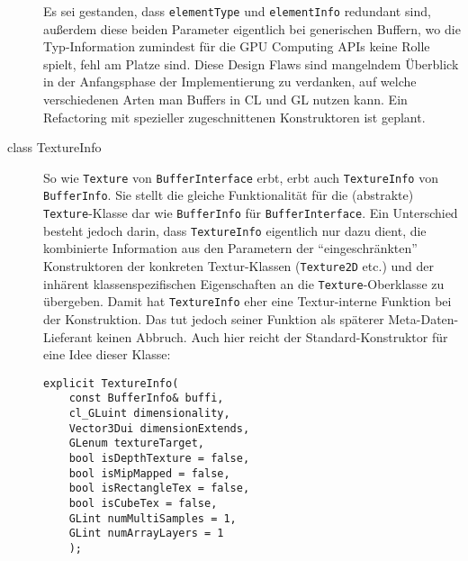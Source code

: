 \begin{description}
		Es sei gestanden, dass \lstinline|elementType| und \lstinline|elementInfo| redundant sind, außerdem diese 
		beiden Parameter eigentlich bei generischen Buffern, wo die Typ-Information zumindest für die GPU Computing APIs
		keine Rolle spielt, fehl am Platze sind. Diese Design Flaws sind mangelndem Überblick in der Anfangsphase der 
		Implementierung zu verdanken, auf welche verschiedenen Arten man Buffers in CL und GL nutzen kann. 
		Ein Refactoring mit spezieller zugeschnittenen Konstruktoren ist geplant.
	
	\item[class TextureInfo]
		So wie \lstinline|Texture| von \lstinline|BufferInterface| erbt, erbt auch 
		\lstinline|TextureInfo| von \lstinline|BufferInfo|. Sie stellt die gleiche Funktionalität für
		die (abstrakte) \lstinline|Texture|-Klasse dar wie \lstinline|BufferInfo| für \lstinline|BufferInterface|.
		Ein Unterschied besteht jedoch darin, dass \lstinline|TextureInfo| eigentlich nur dazu dient, 
		die kombinierte Information aus den Parametern der "`eingeschränkten"' Konstruktoren 
		der konkreten Textur-Klassen (\lstinline|Texture2D| etc.) und der inhärent klassenspezifischen
		Eigenschaften an die \lstinline|Texture|-Oberklasse zu übergeben. Damit hat \lstinline|TextureInfo|
		eher eine Textur-interne Funktion bei der Konstruktion. Das tut jedoch seiner Funktion als späterer
		Meta-Daten-Lieferant keinen Abbruch.
		Auch hier reicht der Standard-Konstruktor für eine Idee dieser Klasse:
		 
		\begin{lstlisting}	
explicit TextureInfo(
	const BufferInfo& buffi,
	cl_GLuint dimensionality,
	Vector3Dui dimensionExtends,
	GLenum textureTarget,
	bool isDepthTexture = false,
	bool isMipMapped = false,
	bool isRectangleTex = false,
	bool isCubeTex = false,
	GLint numMultiSamples = 1,
	GLint numArrayLayers = 1
	);
		\end{lstlisting}			
			
	\end{description}	

